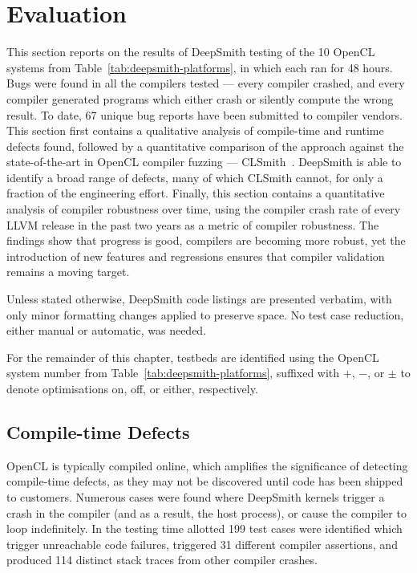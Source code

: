 \section{Evaluation}
\label{sec:deepsmith-eval}

This section reports on the results of DeepSmith testing of the 10 OpenCL systems from Table~\ref{tab:deepsmith-platforms}, in which each ran for 48 hours. Bugs were found in all the compilers tested --- every compiler crashed, and every compiler generated programs which either crash or silently compute the wrong result. To date, 67 unique bug reports have been submitted to compiler vendors. This section first contains a qualitative analysis of compile-time and runtime defects found, followed by a quantitative comparison of the approach against the state-of-the-art in OpenCL compiler fuzzing --- CLSmith~\cite{Lidbury2015a}. DeepSmith is able to identify a broad range of defects, many of which CLSmith cannot, for only a fraction of the engineering effort. Finally, this section contains a quantitative analysis of compiler robustness over time, using the compiler crash rate of every LLVM release in the past two years as a metric of compiler robustness. The findings show that progress is good, compilers are becoming more robust, yet the introduction of new features and regressions ensures that compiler validation remains a moving target.

Unless stated otherwise, DeepSmith code listings are presented verbatim, with only minor formatting changes applied to preserve space. No test case reduction, either manual or automatic, was needed.

For the remainder of this chapter, testbeds are identified using the OpenCL system number from Table~\ref{tab:deepsmith-platforms}, suffixed with $+$, $-$, or $\pm$ to denote optimisations on, off, or either, respectively.

\subsection{Compile-time Defects}%
\label{subsec:compile-time-defects}

OpenCL is typically compiled online, which amplifies the significance of detecting compile-time defects, as they may not be discovered until code has been shipped to customers. Numerous cases were found where DeepSmith kernels trigger a crash in the compiler (and as a result, the host process), or cause the compiler to loop indefinitely. In the testing time allotted 199 test cases were identified which trigger unreachable code failures, triggered 31 different compiler assertions, and produced 114 distinct stack traces from other compiler crashes.

